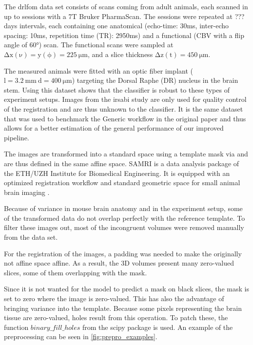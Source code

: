 The drlfom data set consists of  scans coming from  adult animals, each scanned in up to  sessions with a 7T Bruker PharmaScan.
The sessions were repeated at ??? days intervals, each containing one anatomical (echo-time: 30ms, inter-echo spacing: 10ms, repetition time (TR): 2950ms) and a functional (CBV with a flip angle of 60°) scan.
The functional scans were sampled at $\mathrm{\Delta x(\nu)=y(\phi)=\SI{225}{\micro\meter}}$, and a slice thickness $\mathrm{\Delta z(t)=\SI{450}{\micro\meter}}$.

The measured animals were fitted with an optic fiber implant ($\mathrm{l=\SI{3.2}{\milli\meter} \ d=\SI{400}{\micro\meter}}$) targeting the Dorsal Raphe (DR) nucleus in the brain stem.
Using this dataset shows that the classifier is robust to these types of experiment setups.
Images from the irsabi study are only used for quality control of the registration and are thus unknown to the classifier.
It is the same dataset that was used to benchmark the Generic workflow in the original paper and thus allows for a better estimation of the general performance of our improved pipeline.

The images are transformed into a standard space using a template mask via \citep[SAMRI]{noauthor_ibt-fmi/samri_2019} and are thus defined in the same affine space.
SAMRI is a data analysis package of the ETH/UZH Institute for Biomedical Engineering.
It is equipped with an optimized registration workflow and standard geometric space for small animal brain imaging \citep{ioanas_optimized_2019}.

Because of variance in mouse brain anatomy and in the experiment setup, some of the transformed data do not overlap perfectly with the reference template.
To filter these images out, most of the incongruent volumes were removed manually from the data set.

For the registration of the images, a padding was needed to make the originally not affine space affine.
As a result, the 3D volumes present many zero-valued slices, some of them overlapping with the mask.

Since it is not wanted for the model to predict a mask on black slices, the mask is set to zero where the image is zero-valued.
This has also the advantage of bringing variance into the template.
Because some pixels representing the brain tissue are zero-valued, holes result from this operation.
To patch these, the function \textcolor{mg}{\texttt{$binary\_fill\_holes$}} from the scipy package \citep{2020SciPy-NMeth} is used.
An example of the preprocessing can be seen in \cref{fig:prepro_examples}.

